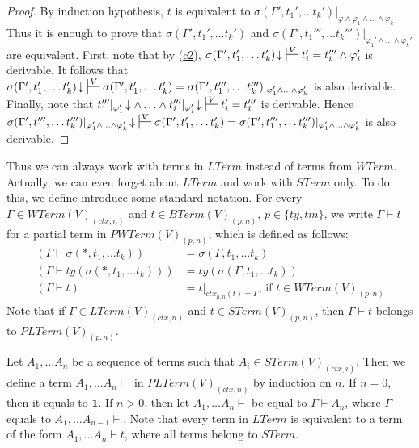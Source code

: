 \documentclass{elsarticle}
\newcommand{\axref}[1]{(\hyperref[ax:#1]{#1})}
\theoremstyle{definition}
\theoremstyle{remark}
\newcommand{\emptyCtx}{\mathbf{1}}
\numberwithin{figure}{section}
\begin{document}
\begin{proof}
By induction hypothesis, $t$ is equivalent to $\sigma(\Gamma', t_1', \ldots t_k')|_{\varphi \land \varphi_1 \land \ldots \land \varphi_k}$.
Thus it is enough to prove that $\sigma(\Gamma', t_1', \ldots t_k')$ and $\sigma(\Gamma', t_1''', \ldots t_k''')|_{\varphi_1' \land \ldots \land \varphi_k'}$ are equivalent.
First, note that by \axref{c2}, $\sigma(\Gamma', t_1', \ldots t_k')\!\downarrow\ \sststile{}{V} t_i' = t_i''' \land \varphi_i'$ is derivable.
It follows that $\sigma(\Gamma', t_1', \ldots t_k')\!\downarrow\ \sststile{}{V} \sigma(\Gamma', t_1', \ldots t_k') = \sigma(\Gamma', t_1''', \ldots t_k''')|_{\varphi_1' \land \ldots \land \varphi_k'}$ is also derivable.
Finally, note that $t_1'''|_{\varphi_1'}\!\downarrow \land \ldots \land t_i'''|_{\varphi_i'}\!\downarrow\ \sststile{}{V} t_i' = t_i'''$ is derivable.
Hence $\sigma(\Gamma', t_1''', \ldots t_k''')|_{\varphi_1' \land \ldots \land \varphi_k'}\!\downarrow\ \sststile{}{V} \sigma(\Gamma', t_1', \ldots t_k') = \sigma(\Gamma', t_1''', \ldots t_k''')|_{\varphi_1' \land \ldots \land \varphi_k'}$ is also derivable.
\end{proof}

Thus we can always work with terms in $LTerm$ instead of terms from $WTerm$.
Actually, we can even forget about $LTerm$ and work with $STerm$ only.
To do this, we define introduce some standard notation.
For every $\Gamma \in WTerm(V)_{(ctx,n)}$ and $t \in BTerm(V)_{(p,n)}$, $p \in \{ ty, tm \}$, we write $\Gamma \vdash t$ for a partial term in $PWTerm(V)_{(p,n)}$, which is defined as follows:
\begin{align*}
(\Gamma \vdash \sigma(*, t_1, \ldots t_k)) & = \sigma(\Gamma, t_1, \ldots t_k) \\
(\Gamma \vdash ty(\sigma(*, t_1, \ldots t_k))) & = ty(\sigma(\Gamma, t_1, \ldots t_k)) \\
(\Gamma \vdash t) & = t|_{ctx_{p,n}(t) = \Gamma} \text{, if } t \in WTerm(V)_{(p,n)}
\end{align*}
Note that if $\Gamma \in LTerm(V)_{(ctx,n)}$ and $t \in STerm(V)_{(p,n)}$, then $\Gamma \vdash t$ belongs to $PLTerm(V)_{(p,n)}$.

Let $A_1, \ldots A_n$ be a sequence of terms such that $A_i \in STerm(V)_{(ctx,i)}$.
Then we define a term $A_1, \ldots A_n \vdash$ in $PLTerm(V)_{(ctx,n)}$ by induction on $n$.
If $n = 0$, then it equals to $\emptyCtx$.
If $n > 0$, then let $A_1, \ldots A_n \vdash$ be equal to $\Gamma \vdash A_n$, where $\Gamma$ equals to $A_1, \ldots A_{n-1} \vdash$.
Note that every term in $LTerm$ is equivalent to a term of the form $A_1, \ldots A_n \vdash t$, where all terms belong to $STerm$.
\end{document}
